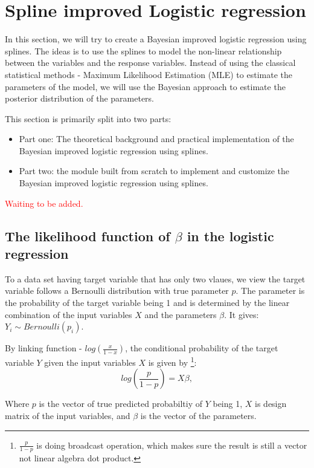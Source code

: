 \section{Spline improved Logistic regression}

In this section, we will try to create a Bayesian improved logistic regression using splines.
The ideas is to use the splines to model the non-linear relationship between the variables and the response variables.
Instead of using the classical statistical methods - Maximum Likelihood Estimation (MLE) to 
estimate the parameters of the model, we will use the Bayesian approach to estimate the posterior distribution of the parameters.

This section is primarily split into two parts:
\begin{itemize}
    \item Part one: The theoretical background and practical implementation of the Bayesian improved logistic regression using splines.
    \item Part two: the module built from scratch to implement and customize the Bayesian improved logistic regression using splines.
\end{itemize}

\textcolor{red}{Waiting to be added.}

\subsection{The likelihood function of $\beta$ in the logistic regression}

To a data set having target variable that has only two vlaues, we view the target variable follows a Bernoulli distribution with
true parameter $p$. The parameter is the probability of the target variable being 1 and is determined by 
the linear combination of the input variables $X$ and the parameters $\beta$. It gives: \(Y_i \sim Bernoulli(p_i)\).

By linking function - \(log(\frac{x}{1-x})\), the conditional probability of the target variable $Y$ given the input variables $X$ is given by
\footnote{$\frac{p}{1-p}$ is doing broadcast operation, which makes sure the result is still a vector 
not linear algebra dot product.}:
\[
log(\frac{p}{1-p}) = X \beta, 
\]

Where \(p\) is the vector of true predicted probabiltiy of \(Y\) being 1, \(X\) is design matrix of the input variables, 
and \(\beta\) is the vector of the parameters.


